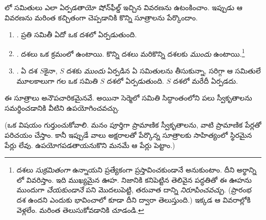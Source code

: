 \documentclass[../../../include/open-logic-section]{subfiles}
\begin{document}
	
లో
సమితులు ఎలా ఏర్పడతాయో షోన్‌ఫీల్డ్ ఇచ్చిన వివరణను
ఉటంకించాం. ఇప్పుడు ఆ వివరణను మరింత కచ్చితంగా చెప్పడానికి
కొన్ని సూత్రాలను పేర్కొందాం.
\begin{enumerate}
\item[] \stageshier. ప్రతి సమితీ ఏదో ఒక దశలో ఏర్పడుతుంది.
\item[] \stagesord. దశలు ఒక క్రమంలో ఉంటాయి. కొన్ని దశలు మరికొన్ని దశలకు \emph{ముందు}
ఉంటాయి.\footnote{దశలు \emph{సుక్రమితంగా} ఉన్నాయని
ప్రత్యేకంగా ప్రస్తావించకుండానే అనుకుంటాం.
దీని అర్థాన్ని లో
వివరిస్తాం. ఇది ముఖ్యమైన
ఊహ. నిజానికి \citet{Scott1974}
కనిపెట్టిన తెలివైన పద్ధతితో
ఈ ఊహను ముందుగా \emph{చేయకుండానే} పని మొదలుపెట్టి, తరువాత
దాన్ని \emph{నిరూపించవచ్చు}.
(ప్రారంభ దశ ఉందని ఎందుకు
భావించాలో కూడా దీని ద్వారా
తెలుస్తుంది.) ఇక్కడ ఆ వివరాల్లోకి
వెళ్లలేం. మరింత తెలుసుకోవడానికి
\citet{ButtonLT1} చూడండి.} 
\item[] \stagesacc. ఏ దశ $S$కైనా, $S$ దశకు
\emph{ముందు} ఏర్పడిన ఏ
సమితులను తీసుకున్నా,
సరిగ్గా ఆ సమితులే
మూలకాలుగా గల ఒక సమితి
$S$ దశలో ఏర్పడుతుంది.
$S$ దశలో మరేదీ ఏర్పడదు.
\end{enumerate}
ఈ సూత్రాలు అనౌపచారికమైనవే. అయినా సెర్మెలో సమితి
సిద్ధాంతంలోని పలు స్వీకృతాలను సమర్థించడానికి
వీటిని ఉపయోగించవచ్చు.

(ఒక విషయం గుర్తుంచుకోవాలి.
మనం పూర్తిగా ప్రామాణిక
స్వీకృతాలను, వాటి ప్రామాణిక
పేర్లతో పరిచయం చేస్తాం.
కానీ ఇప్పుడే వాలు అక్షరాలతో పేర్కొన్న సూత్రాలకు
సాహిత్యంలో స్థిరమైన పేర్లు లేవు.
ఉపయోగపడతాయనుకొని మనమే ఆ పేర్లు పెట్టాం.)
\end{document}
